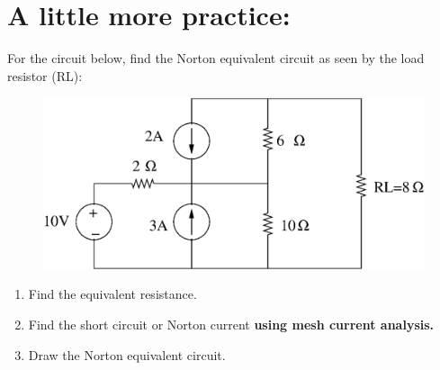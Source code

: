 \section{A little more practice:}
For the circuit below, find the Norton equivalent circuit as seen 
by the load resistor (RL):
\begin{figure}[h!]
\begin{minipage}[l]{0.8\linewidth}
\centering
\includegraphics[width=5.0in]{p6/p6.eps}
\end{minipage}
\end{figure}
\begin{enumerate}
\item Find the equivalent resistance.
\item Find the short circuit or Norton current \textbf{\large using mesh current analysis.}
\item Draw the Norton equivalent circuit.
\end{enumerate}


\newpage
